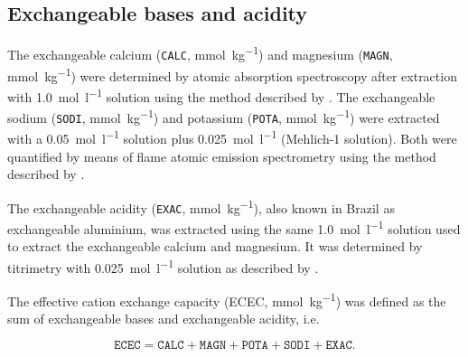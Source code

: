 {\tocless\subsection{Exchangeable bases and acidity}

The exchangeable calcium (\texttt{CALC}, \si{\milli\mole\per\kilo\gram}) and magnesium (\texttt{MAGN}, 
\si{\milli\mole\per\kilo\gram}) were determined by atomic absorption spectroscopy after extraction with 
\SI{1.0}{\mole\per\litre}  solution using the method described by . 
The exchangeable sodium (\texttt{SODI}, \si{\milli\mole\per\kilo\gram}) and potassium (\texttt{POTA}, 
\si{\milli\mole\per\kilo\gram}) were extracted with a \SI{0.05}{\mole\per\litre}  solution plus 
\SI{0.025}{\mole\per\litre}  (Mehlich-\num{1} solution). Both were quantified by means of flame 
atomic emission spectrometry using the method described by .

The exchangeable acidity (\texttt{EXAC}, \si{\milli\mole\per\kilo\gram}), also known in Brazil as exchangeable 
aluminium, was extracted using the same \SI{1.0}{\mole\per\litre}  solution used to extract the 
exchangeable calcium and magnesium. It was determined by titrimetry with \SI{0.025}{\mole\per\litre} 
 solution as described by .


The effective cation exchange capacity (ECEC, \si{\milli\mole\per\kilo\gram}) was defined as the sum of 
exchangeable bases and exchangeable acidity, i.e. 

\begin{equation*}
 \texttt{ECEC} = \texttt{CALC} + \texttt{MAGN} + \texttt{POTA} + \texttt{SODI} + \texttt{EXAC}.
\end{equation*}



}
